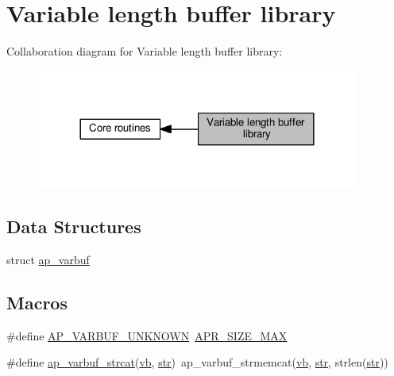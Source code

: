 \hypertarget{group__APACHE__CORE__VARBUF}{}\section{Variable length buffer library}
\label{group__APACHE__CORE__VARBUF}
Collaboration diagram for Variable length buffer library\+:
\nopagebreak
\begin{figure}[H]
\begin{center}
\leavevmode
\includegraphics[width=300pt]{group__APACHE__CORE__VARBUF}
\end{center}
\end{figure}
\subsection*{Data Structures}
\begin{DoxyCompactItemize}
\item 
struct \hyperlink{structap__varbuf}{ap\+\_\+varbuf}
\end{DoxyCompactItemize}
\subsection*{Macros}
\begin{DoxyCompactItemize}
\item 
\#define \hyperlink{group__APACHE__CORE__VARBUF_ga7b0f7b7564e4d213b14d373f51535b89}{A\+P\+\_\+\+V\+A\+R\+B\+U\+F\+\_\+\+U\+N\+K\+N\+O\+WN}~\hyperlink{group__apr__platform_gab5865d64b134a3924014837dd44627a7}{A\+P\+R\+\_\+\+S\+I\+Z\+E\+\_\+\+M\+AX}
\item 
\#define \hyperlink{group__APACHE__CORE__VARBUF_ga5012244e20c3f22d53ea3109f3fc234f}{ap\+\_\+varbuf\+\_\+strcat}(\hyperlink{group__APACHE__CORE__VARBUF_ga29f1d61bf61bdf84c1b79497ddbe762d}{vb},  \hyperlink{group__APR__Util__Bucket__Brigades_ga6a62b60443be1d042194af15ce934193}{str})~ap\+\_\+varbuf\+\_\+strmemcat(\hyperlink{group__APACHE__CORE__VARBUF_ga29f1d61bf61bdf84c1b79497ddbe762d}{vb}, \hyperlink{group__APR__Util__Bucket__Brigades_ga6a62b60443be1d042194af15ce934193}{str}, strlen(\hyperlink{group__APR__Util__Bucket__Brigades_ga6a62b60443be1d042194af15ce934193}{str}))
\end{DoxyCompactItemize}
